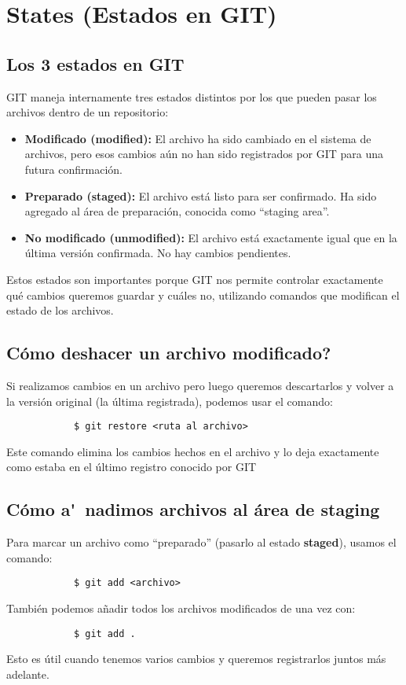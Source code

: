\section{States (Estados en GIT)}

    \subsection{Los 3 estados en GIT}
        GIT maneja internamente tres estados distintos por los que pueden pasar los archivos dentro de un repositorio:
        \begin{itemize}
            \item \textbf{Modificado (modified):} El archivo ha sido cambiado en el sistema de archivos, pero esos cambios a\'un no han sido registrados por GIT para una futura confirmaci\'on.
            \item \textbf{Preparado (staged):} El archivo est\'a listo para ser confirmado. Ha sido agregado al \'area de preparaci\'on, conocida como ``staging area''.
            \item \textbf{No modificado (unmodified):} El archivo est\'a exactamente igual que en la \'ultima versión confirmada. No hay cambios pendientes.
        \end{itemize}
        Estos estados son importantes porque GIT nos permite controlar exactamente qu\'e cambios queremos guardar y cu\'ales no, utilizando comandos que modifican el estado de los archivos.

    \subsection{C\'omo deshacer un archivo modificado?}
        Si realizamos cambios en un archivo pero luego queremos descartarlos y volver a la versi\'on original (la \'ultima registrada), podemos usar el comando:
        \begin{lstlisting}
            $ git restore <ruta al archivo>
        \end{lstlisting}
        Este comando elimina los cambios hechos en el archivo y lo deja exactamente como estaba en el \'ultimo registro conocido por GIT

    \subsection{Cómo a\'~nadimos archivos al área de staging}
        Para marcar un archivo como ``preparado'' (pasarlo al estado \textbf{staged}), usamos el comando:
        \begin{lstlisting}
            $ git add <archivo>
        \end{lstlisting}
        Tambi\'en podemos añadir todos los archivos modificados de una vez con:
        \begin{lstlisting}
            $ git add .
        \end{lstlisting}
        Esto es \'util cuando tenemos varios cambios y queremos registrarlos juntos m\'as adelante.


